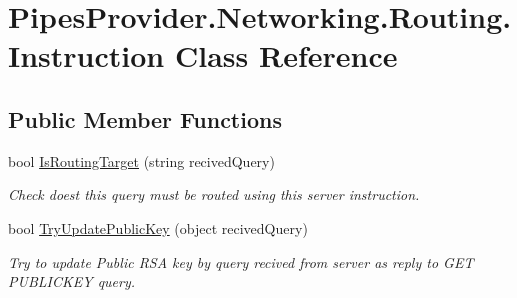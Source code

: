 \hypertarget{class_pipes_provider_1_1_networking_1_1_routing_1_1_instruction}{}\section{Pipes\+Provider.\+Networking.\+Routing.\+Instruction Class Reference}
\label{class_pipes_provider_1_1_networking_1_1_routing_1_1_instruction}


 


\subsection*{Public Member Functions}
\begin{DoxyCompactItemize}
\item 
bool \mbox{\hyperlink{class_pipes_provider_1_1_networking_1_1_routing_1_1_instruction_a376135eac06c59b1df8d2f5d1617bed9}{Is\+Routing\+Target}} (string recived\+Query)
\begin{DoxyCompactList}\small\item\em Check doest this query must be routed using this server instruction. \end{DoxyCompactList}\item 
bool \mbox{\hyperlink{class_pipes_provider_1_1_networking_1_1_routing_1_1_instruction_a04ee08d3b41785e88679c6870c392266}{Try\+Update\+Public\+Key}} (object recived\+Query)
\begin{DoxyCompactList}\small\item\em Try to update Public R\+SA key by query recived from server as reply to G\+ET P\+U\+B\+L\+I\+C\+K\+EY query. \end{DoxyCompactList}\end{DoxyCompactItemize}
